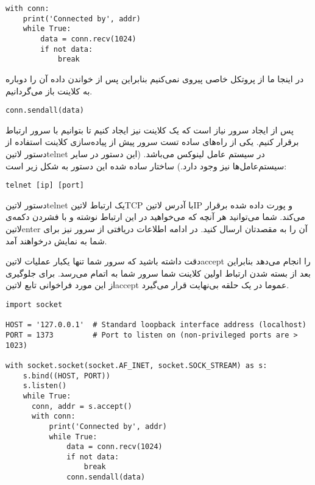 \documentclass[]{article}
\begin{document}
  \begin{latin}
  \begin{verbatim}
with conn:
    print('Connected by', addr)
    while True:
        data = conn.recv(1024)
        if not data:
            break
  \end{verbatim}
  \end{latin}

  در اینجا ما از پروتکل خاصی پیروی نمی‌کنیم بنابراین پس از خواندن داده آن را دوباره به کلاینت باز می‌گردانیم.

  \begin{latin}
  \begin{verbatim}
conn.sendall(data)
  \end{verbatim}
  \end{latin}


  پس از ایجاد سرور نیاز است که یک کلاینت نیز ایجاد کنیم تا بتوانیم با سرور ارتباط برقرار کنیم.
  یکی از راه‌های ساده تست سرور پیش از پیاده‌سازی کلاینت استفاده از دستور ‌لاتین{telnet} در سیستم عامل لینوکس می‌باشد.
  (این دستور در سایر سیستم‌عامل‌ها نیز وجود دارد.)
  ساختار ساده شده این دستور به شکل زیر است:

  \begin{latin}
  \begin{verbatim}
telnet [ip] [port]
  \end{verbatim}
  \end{latin}

  دستور ‌لاتین{telnet} یک ارتباط ‌لاتین{TCP} با آدرس ‌لاتین{IP} و پورت داده شده برقرار می‌کند.
  شما می‌توانید هر آنچه که می‌خواهید در این ارتباط نوشته و با فشردن دکمه‌ی ‌لاتین{enter} آن را به مقصدتان ارسال کنید.
  در ادامه اطلاعات دریافتی از سرور نیز برای شما به نمایش درخواهند آمد.

  دقت داشته باشید که سرور شما تنها یکبار عملیات ‌لاتین{accept} را انجام می‌دهد بنابراین بعد از بسته شدن ارتباط اولین کلاینت شما
  سرور شما به اتمام می‌رسد. برای جلوگیری از این مورد فراخوانی تابع ‌لاتین{accept} عموما در یک حلقه بی‌نهایت قرار می‌گیرد.

  \begin{latin}
  \begin{verbatim}
import socket

HOST = '127.0.0.1'  # Standard loopback interface address (localhost)
PORT = 1373         # Port to listen on (non-privileged ports are > 1023)

with socket.socket(socket.AF_INET, socket.SOCK_STREAM) as s:
    s.bind((HOST, PORT))
    s.listen()
    while True:
      conn, addr = s.accept()
      with conn:
          print('Connected by', addr)
          while True:
              data = conn.recv(1024)
              if not data:
                  break
              conn.sendall(data)
  \end{verbatim}
  \end{latin}
\end{document}
